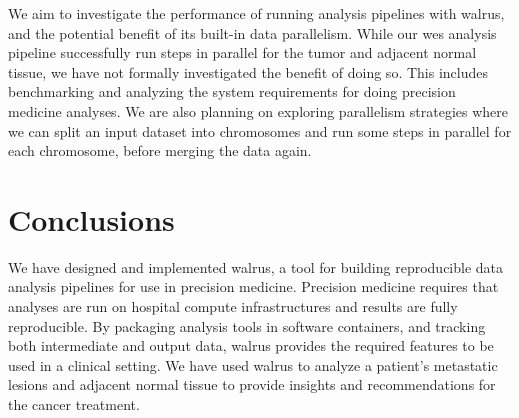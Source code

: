 We aim to investigate the performance of running analysis pipelines with walrus,
and the potential benefit of its built-in data parallelism. While
our \gls{wes} analysis pipeline successfully run steps in parallel for the
tumor and adjacent normal tissue, we have not formally investigated the benefit
of doing so. This includes benchmarking and analyzing the system requirements
for doing precision medicine analyses. 
We are also planning on exploring parallelism strategies where we
can split an input dataset into chromosomes and run some steps in parallel for
each chromosome, before merging the data again. 

\section{Conclusions} 
We have designed and implemented walrus, a tool for building reproducible data
analysis pipelines for use in precision medicine. Precision medicine requires
that analyses are run on hospital compute infrastructures and results are fully
reproducible.  By packaging analysis tools in software containers, and tracking
both intermediate and output data, walrus provides the required features to be
used in a clinical setting. 
We have used walrus to analyze a patient's metastatic lesions and adjacent
normal tissue to provide insights and recommendations for the cancer treatment. 


